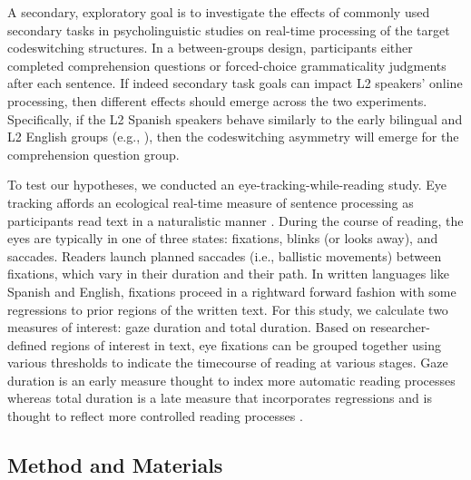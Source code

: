 \documentclass[output=paper,colorlinks,citecolor=brown]{langscibook}
\begin{document}
A secondary, exploratory goal is to investigate the effects of commonly used secondary tasks in psycholinguistic studies on real-time processing of the target codeswitching structures. In a between-groups design, participants either completed comprehension questions or forced-choice grammaticality judgments after each sentence. If indeed secondary task goals can impact L2 speakers' online processing, then different effects should emerge across the two experiments. Specifically, if the L2 Spanish speakers behave similarly to the early bilingual and L2 English groups (e.g., \cite{ValdesKroffetal2018}), then the codeswitching asymmetry will emerge for the comprehension question group.

To test our hypotheses, we conducted an eye-tracking-while-reading study. Eye tracking affords an ecological real-time measure of sentence processing as participants read text in a naturalistic manner \citep{ValdesKroffetal2018}. During the course of reading, the eyes are typically in one of three states: fixations, blinks (or looks away), and saccades. Readers launch planned saccades (i.e., ballistic movements) between fixations, which vary in their duration and their path. In written languages like Spanish and English, fixations proceed in a rightward forward fashion with some regressions to prior regions of the written text.  For this study, we calculate two measures of interest: gaze duration and total duration.  Based on researcher-defined regions of interest in text, eye fixations can be grouped together using various thresholds to indicate the timecourse of reading at various stages. Gaze duration is an early measure thought to index more automatic reading processes whereas total duration is a late measure that incorporates regressions and is thought to reflect more controlled reading processes \citep{Rayner1998,Godfroid2019}.

\subsection{Method and Materials}
\end{document}
